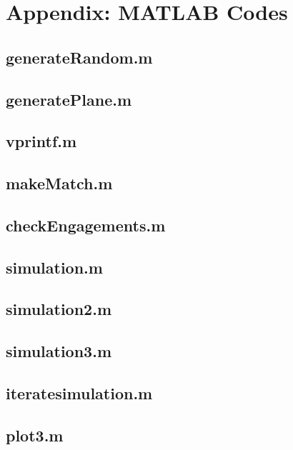 \documentclass[11pt]{article}
\begin{document}
\section{Appendix: MATLAB Codes}

\subsection*{generateRandom.m}

\subsection*{generatePlane.m}

\subsection*{vprintf.m}

\subsection*{makeMatch.m}

\subsection*{checkEngagements.m}

\subsection*{simulation.m}

\subsection*{simulation2.m}

\subsection*{simulation3.m}

\subsection*{iteratesimulation.m}

\subsection*{plot3.m}

\end{document}
